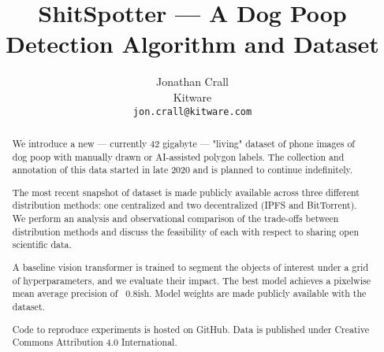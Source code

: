 \documentclass[10pt,twocolumn,letterpaper]{article}
\begin{document}
\title{ShitSpotter --- A Dog Poop Detection Algorithm and Dataset}

\author{Jonathan Crall\\
Kitware\\
{\tt\small jon.crall@kitware.com}
}
\maketitle

\begin{comment}
    cd $HOME/code/shitspotter
    python -m shitspotter.cli.coco_annotation_stats $HOME/data/dvc-repos/shitspotter_dvc/data.kwcoco.json \
        --dst_fpath $HOME/code/shitspotter/coco_annot_stats/stats.json \
        --dst_dpath $HOME/code/shitspotter/coco_annot_stats
\end{comment}

\begin{abstract}

We introduce a new --- currently 42 gigabyte --- "living" dataset of phone images of
dog poop with manually drawn or AI-assisted polygon labels.
The collection and annotation of this data started in late 2020 and is planned
to continue indefinitely.

The most recent snapshot of dataset is made publicly available across three
different distribution methods: one centralized and two decentralized (IPFS and
BitTorrent).
We perform an analysis and observational comparison of the trade-offs between
distribution methods and discuss the feasibility of each with respect to
sharing open scientific data.

A baseline vision transformer is trained to segment the objects of interest
under a grid of hyperparameters, and we evaluate their impact. The best model
achieves a pixelwise mean average precision of ~0.8ish. 
Model weights are made publicly available with the dataset. 

Code to reproduce experiments is hosted on GitHub. Data is published under
Creative Commons Attribution 4.0 International.


\end{abstract}
\end{document}

